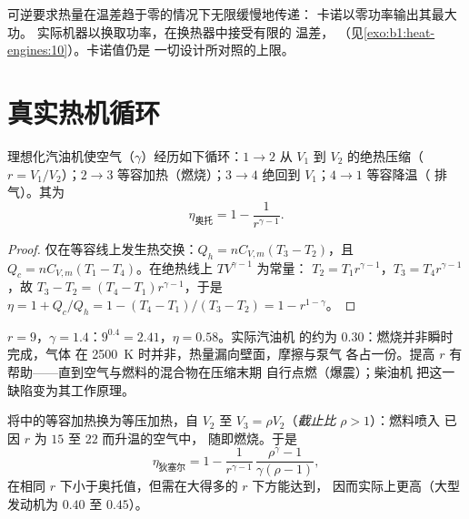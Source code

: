 \begin{remark}\label{rem:b1:heat-engines:notengine}
可逆要求热量在温差趋于零的情况下无限缓慢地传递：
卡诺以零功率输出其最大功。
实际机器以换取功率，在换热器中接受有限的
温差，
（见\cref{exo:b1:heat-engines:10}）。卡诺值仍是
一切设计所对照的上限。
\end{remark}

\section{真实热机循环}

\begin{proposition}[奥托循环]\label{prop:b1:heat-engines:otto}
理想化汽油机使空气（$\gamma$）经历如下循环：$1 \to 2$
从 $V_1$ 到 $V_2$ 的绝热压缩（\emph{}
$r = V_1/V_2$）；$2 \to 3$ 等容加热（燃烧）；$3 \to 4$
绝回到 $V_1$；$4 \to 1$ 等容降温（
排气）。其为
\[
\eta_{\text{奥托}} = 1 - \frac{1}{r^{\gamma-1}} .
\]
\end{proposition}

\begin{proof}
仅在等容线上发生热交换：$Q_h = nC_{V,m}(T_3 - T_2)$，且
$Q_c = nC_{V,m}(T_1 - T_4)$。在绝热线上 $TV^{\gamma-1}$ 为常量：
$T_2 = T_1r^{\gamma-1}$，$T_3 = T_4r^{\gamma-1}$，故 $T_3 - T_2 =
(T_4 - T_1)r^{\gamma-1}$，于是
$\eta = 1 + Q_c/Q_h = 1 - (T_4 - T_1)/(T_3 - T_2) = 1 - r^{1-\gamma}$。
\end{proof}

\begin{example}[汽油机的数值]\label{ex:b1:heat-engines:ottonumbers}
$r = 9$，$\gamma = 1.4$：$9^{0.4} = 2.41$，$\eta = 0.58$。实际汽油机
的约为 $0.30$：燃烧并非瞬时完成，气体
在 \qty{2500}{K} 时并非，热量漏向壁面，摩擦与泵气
各占一份。提高 $r$ 有帮助——直到空气与燃料的混合物在压缩末期
自行点燃（爆震）；柴油机
把这一缺陷变为其工作原理。
\end{example}

\begin{proposition}[狄塞尔循环]\label{prop:b1:heat-engines:diesel}
将中的等容加热换为等压加热，自
$V_2$ 至 $V_3 = \rho V_2$（\emph{截止比} $\rho > 1$）：燃料喷入
已因 $r$ 为 $15$ 至 $22$ 而升温的空气中，
随即燃烧。于是
\[
\eta_{\text{狄塞尔}} = 1 - \frac{1}{r^{\gamma-1}}\,\frac{\rho^{\gamma} - 1}{\gamma(\rho - 1)} ,
\]
在相同 $r$ 下小于奥托值，但需在大得多的 $r$ 下方能达到，
因而实际上更高（大型发动机为 $0.40$ 至 $0.45$）。
\end{proposition}

